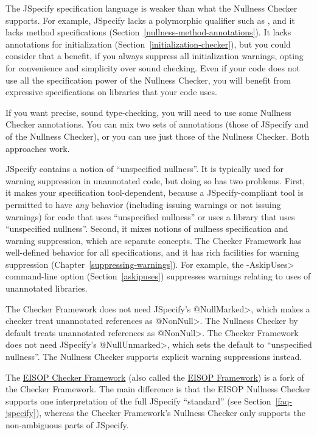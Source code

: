 The JSpecify specification language is weaker than what the Nullness
Checker supports.  For example, JSpecify lacks a polymorphic qualifier such
as , and it lacks method
specifications (Section~\ref{nullness-method-annotations}).  It lacks
annotations for initialization (Section~\ref{initialization-checker}), but
you could consider that a benefit, if you always suppress all
initialization warnings, opting for convenience and simplicity over sound
checking.  Even if your code does not use all the specification power of
the Nullness Checker, you will benefit from expressive specifications on
libraries that your code uses.

If you want precise, sound type-checking, you will need to use some
Nullness Checker annotations.  You can mix two sets of annotations (those
of JSpecify and of the Nullness Checker), or you can use just those of the
Nullness Checker.  Both approaches work.

JSpecify contains a notion of ``unspecified nullness''.  It is typically
used for warning suppression in unannotated code, but doing so has two
problems.  First, it makes your specification tool-dependent, because a
JSpecify-compliant tool is permitted to have \emph{any} behavior (including issuing
warnings or not issuing warnings) for code that uses ``unspecified
nullness'' or uses a library that uses ``unspecified nullness''.  Second, it
mixes notions of nullness specification and warning suppression, which are
separate concepts.  The Checker Framework has well-defined behavior for all
specifications, and it has rich facilities for warning suppression
(Chapter~\ref{suppressing-warnings}).  For example, the \<-AskipUses>
command-line option (Section~\ref{askipuses}) suppresses warnings relating
to uses of unannotated libraries.

The Checker Framework does not need JSpecify's \<@NullMarked>, which makes
a checker treat unannotated references as \<@NonNull>.  The Nullness
Checker by default treats unannotated references as \<@NonNull>.  The
Checker Framework does not need JSpecify's \<@NullUnmarked>, which sets the
default to ``unspecified nullness''.  The Nullness Checker supports
explicit warning suppressions instead.



The \href{https://github.com/eisop/checker-framework}{EISOP Checker
Framework} (also called the \href{https://eisop.github.io/}{EISOP
Framework}) is a fork of the Checker Framework.  The main difference is
that the EISOP Nullness Checker supports one interpretation of the full
JSpecify ``standard'' (see Section~\ref{faq-jspecify}), whereas the Checker
Framework's Nullness Checker only supports the non-ambiguous parts of
JSpecify.


